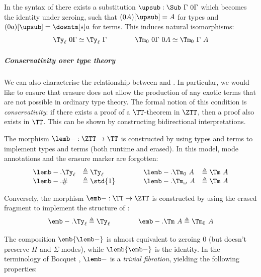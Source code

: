 \documentclass[a4paper,UKenglish,cleveref,autoref,thm-restate]{lipics-v2021}
\begin{document}
\begin{theorem}\label{thm:need-nothing}
  In the syntax of \ZTT there
  exists a substitution $\upsub : \Sub\ \Gamma\ 0\Gamma$ which becomes the identity
  under zeroing, such that $(0A)[\upsub] = A$ for types and $(0a)[\upsub] = \downtm[\star] a$ for terms.
  This induces natural isomorphisms:
  \[\begin{array}{l}
    \Ty_\ell\ 0\Gamma \simeq \Ty_\ell\ \Gamma \qquad\qquad
    \Tm_0\ 0\Gamma\ 0 A \simeq \Tm_0\ \Gamma\ A
  \end{array}\]
\end{theorem}

\subparagraph{Conservativity over type theory}
We can also characterise the relationship between \ZTT and \TT. In particular,
we would like to ensure that erasure does not allow the production of any exotic
terms that are not possible in ordinary type theory. The formal notion of this
condition is \emph{conservativity}: if there exists a proof of a $\TT$-theorem
in $\ZTT$, then a proof also exists in $\TT$. This can be shown by constructing
bidirectional interpretations.

\begin{definition}\label{def:tt-model}
  The morphism $\lemb - :
  \ZTT \to \TT$ is constructed by using \TT types and terms to implement \ZTT
  types and terms (both runtime and erased). In this model, mode annotations and
  the erasure marker are forgotten:
  \[\begin{array}{ll@{\qquad\qquad}ll}
  \lemb-.\Ty_\ell      &\triangleq \Ty_\ell  &
  \lemb-.\Tm_0\ A      &\triangleq \Tm\ A  \\
  \lemb-.\#            &\triangleq \std{1}  &
  \lemb-.\Tm_\omega\ A &\triangleq \Tm\ A
  \end{array}\]
\end{definition}


\begin{definition}\label{def:0tt-model}
  Conversely, the morphism $\emb - : \TT \to \ZTT$ is constructed
  by using the erased fragment to implement the structure of \TT:
  \[
  \emb-.\Ty_\ell \triangleq  \Ty_\ell \qquad\qquad
  \emb-.\Tm\ A \triangleq  \Tm_0\ A
  \]
\end{definition}

The composition $\emb{\lemb-}$ is almost equivalent to zeroing $0$ (but doesn't
preserve $\Pi$ and $\Sigma$ modes), while $\lemb{\emb-}$ is the identity. In the
terminology of Bocquet \cite[p.~40]{Bocquet2025-ox}, $\lemb -$ is a \emph{trivial
fibration}, yielding the following properties:
\end{document}
